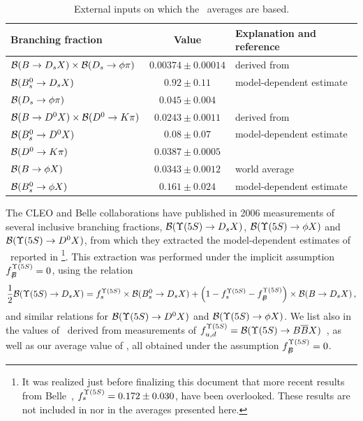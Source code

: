 \begin{table}
\caption{External inputs on which the \fsfive\ averages are based.}
\begin{center}
\begin{tabular}{lcl}
\hline
Branching fraction   & Value     & Explanation and reference \\
\hline
${\cal B}(B\to D_s X)\times {\cal B}(D_s \to \phi\pi)$ & 
$0.00374\pm 0.00014$ & derived from~\cite{PDG_2012} \\
${\cal B}(B^0_s \to D_s X)$ & 
$0.92\pm0.11$ & model-dependent estimate~\cite{Artuso:2005xw} \\
${\cal B}(D_s \to \phi\pi)$ & 
$0.045\pm0.004$ & \cite{PDG_2012} \\
${\cal B}(B\to D^0 X)\times {\cal B}(D^0 \to K\pi)$ & 
$0.0243\pm0.0011$ & derived from~\cite{PDG_2012} \\
${\cal B}(B^0_s \to D^0 X)$ & 
$0.08\pm0.07$ & model-dependent estimate~\cite{Drutskoy:2006fg,Artuso:2005xw} \\
${\cal B}(D^0 \to K\pi)$ & 
$0.0387\pm0.0005$ & \cite{PDG_2012} \\
${\cal B}(B \to \phi X)$ & 
$0.0343\pm0.0012$ & world average~\cite{PDG_2012,Huang:2006em_mod} \\
${\cal B}(B^0_s \to \phi X)$ &
$0.161\pm0.024$ & model-dependent estimate~\cite{Huang:2006em_mod} \\
\hline
\end{tabular}
\end{center}
\end{table}

The CLEO and Belle collaborations have published in 2006
measurements of several inclusive \Upsfive branching fractions, 
${\cal B}(\Upsilon(5S)\to D_s X)$, 
${\cal B}(\Upsilon(5S)\to \phi X)$ and 
${\cal B}(\Upsilon(5S)\to D^0 X)$, %
from which they extracted the
model-dependent estimates of \fsfive\
reported in \footnote{%
  \label{foot:life_mix:Esen:2012yz_mod}
  It was realized just before finalizing this document that
  more recent results from Belle~\cite{Esen:2012yz}, 
  $f^{\Upsilon(5S)}_{s} = 0.172 \pm 0.030$, have been overlooked. These results are 
  not included in \Table{fsFiveS} nor in the averages presented here. 
}. %
This extraction was performed 
under the implicit assumption  
$f^{\Upsilon(5S)}_{B\!\!\!\!/}=0$, using the relation 
\begin{equation}
\frac12{\cal B}(\Upsfive\to D_s X)=\fsfive\times{\cal B}(B_s^0\to D_s X) + 
\left(1-\fsfive-\fnBfive\right)\times{\cal B}(B\to D_s X) \,,
\labe{Ds_correct}
\end{equation}
and similar relations for
${\cal B}(\Upsilon(5S)\to D^0 X)$ and ${\cal B}(\Upsilon(5S)\to \phi X)$.
We list also in  
the values of \fsfive\ derived from measurements of
$\fudfive={\cal B}(\Upsfive\to B\bar BX)$~\cite{Huang:2006em_mod,Drutskoy:2010an}, as well as our average value of  \fsfive,
all obtained under the assumption $f^{\Upsilon(5S)}_{B\!\!\!\!/}=0$.

